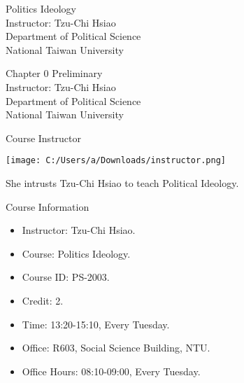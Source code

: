 \documentclass{beamer}
\title{}
\author{}
\date{}
\begin{document}
\begin{frame}
\begin{center}
\Large{Politics Ideology} \\
\vspace{3em}
\normalsize{Instructor: Tzu-Chi Hsiao} \\
\vspace{3em}
\small{Department of Political Science} \\
\vspace{1em}
\small{National Taiwan University}
\end{center}
\end{frame}
\begin{frame}
\begin{center}
\Large{Chapter 0 Preliminary} \\
\vspace{3em}
\normalsize{Instructor: Tzu-Chi Hsiao} \\
\vspace{3em}
\small{Department of Political Science} \\
\vspace{1em}
\small{National Taiwan University} \\
\end{center}
\end{frame}
\begin{frame}{Course Instructor}
\begin{center}
\texttt{[image: C:/Users/a/Downloads/instructor.png]}
\end{center}
\begin{center}
She intrusts Tzu-Chi Hsiao to teach Political Ideology.
\end{center}
\end{frame}
\begin{frame}{Course Information}
\begin{itemize}
\pause
\item Instructor: Tzu-Chi Hsiao.
\pause
\item Course: Politics Ideology.
\pause
\item Course ID: PS-2003.
\pause
\item Credit: 2.
\pause
\item Time: 13:20-15:10, Every Tuesday.
\pause
\item Office: R603, Social Science Building, NTU.
\pause
\item Office Hours: 08:10-09:00, Every Tuesday.
\end{itemize}
\end{frame}
\end{document}
